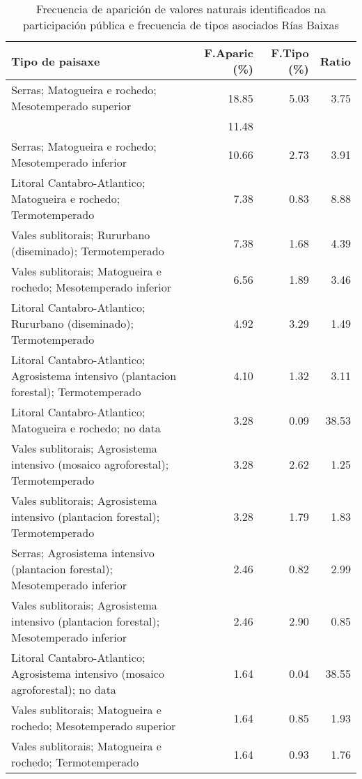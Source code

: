 \begin{table}[p]
\centering
\caption{Frecuencia de aparición de valores naturais identificados na participación pública e frecuencia de tipos asociados Rías Baixas} 
\label{vsixotnat12}
\begin{tabular}{lrrr}
  \hline
Tipo de paisaxe & F.Aparic (\%) & F.Tipo (\%) & Ratio \\ 
  \hline
Serras; Matogueira e rochedo; Mesotemperado superior & 18.85 & 5.03 & 3.75 \\ 
   & 11.48 &  &  \\ 
  Serras; Matogueira e rochedo; Mesotemperado inferior & 10.66 & 2.73 & 3.91 \\ 
  Litoral Cantabro-Atlantico; Matogueira e rochedo; Termotemperado & 7.38 & 0.83 & 8.88 \\ 
  Vales sublitorais; Rururbano (diseminado); Termotemperado & 7.38 & 1.68 & 4.39 \\ 
  Vales sublitorais; Matogueira e rochedo; Mesotemperado inferior & 6.56 & 1.89 & 3.46 \\ 
  Litoral Cantabro-Atlantico; Rururbano (diseminado); Termotemperado & 4.92 & 3.29 & 1.49 \\ 
  Litoral Cantabro-Atlantico; Agrosistema intensivo (plantacion forestal); Termotemperado & 4.10 & 1.32 & 3.11 \\ 
  Litoral Cantabro-Atlantico; Matogueira e rochedo; no data & 3.28 & 0.09 & 38.53 \\ 
  Vales sublitorais; Agrosistema intensivo (mosaico agroforestal); Termotemperado & 3.28 & 2.62 & 1.25 \\ 
  Vales sublitorais; Agrosistema intensivo (plantacion forestal); Termotemperado & 3.28 & 1.79 & 1.83 \\ 
  Serras; Agrosistema intensivo (plantacion forestal); Mesotemperado inferior & 2.46 & 0.82 & 2.99 \\ 
  Vales sublitorais; Agrosistema intensivo (plantacion forestal); Mesotemperado inferior & 2.46 & 2.90 & 0.85 \\ 
  Litoral Cantabro-Atlantico; Agrosistema intensivo (mosaico agroforestal); no data & 1.64 & 0.04 & 38.55 \\ 
  Vales sublitorais; Matogueira e rochedo; Mesotemperado superior & 1.64 & 0.85 & 1.93 \\ 
  Vales sublitorais; Matogueira e rochedo; Termotemperado & 1.64 & 0.93 & 1.76 \\ 
   \hline
\end{tabular}
\end{table}
